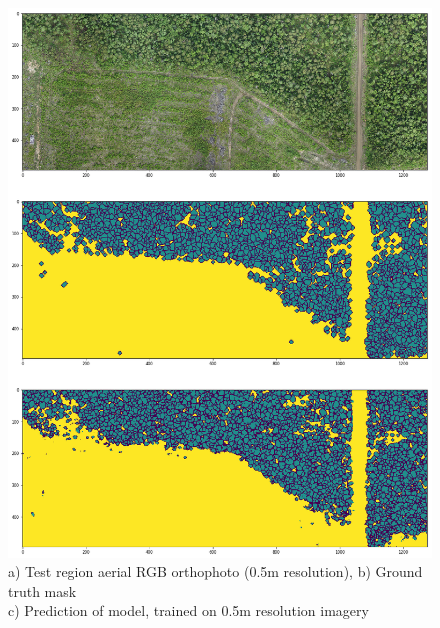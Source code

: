 \clearpage
\newpage
\begin{figure}[p]
\centering
\includegraphics[scale=0.45]{images/TEST05APP.png}
\caption{a) Test region aerial RGB orthophoto (0.5m resolution), b) Ground truth mask \\c) Prediction of model, trained on 0.5m  resolution imagery}
\label{TEST03}
\end{figure}

\clearpage
\newpage


